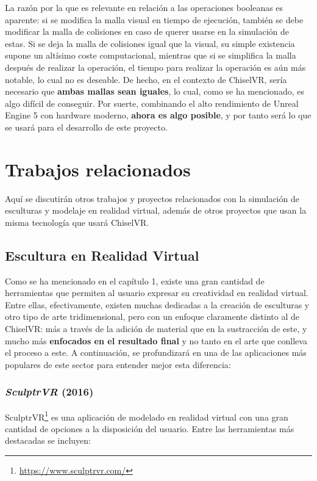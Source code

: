 La razón por la que es relevante en relación a las operaciones booleanas es aparente: si se modifica la malla visual en tiempo de ejecución, también se debe modificar la malla de colisiones en caso de querer usarse en la simulación de estas. Si se deja la malla de colisiones igual que la visual, su simple existencia supone un altísimo coste computacional, mientras que si se simplifica la malla después de realizar la operación, el tiempo para realizar la operación es aún más notable, lo cual no es deseable. De hecho, en el contexto de ChiselVR, sería necesario que \textbf{ambas mallas sean iguales}, lo cual, como se ha mencionado, es algo difícil de conseguir. Por suerte, combinando el alto rendimiento de Unreal Engine 5 con hardware moderno, \textbf{ahora es algo posible}, y por tanto será lo que se usará para el desarrollo de este proyecto.

\section{Trabajos relacionados}

Aquí se discutirán otros trabajos y proyectos relacionados con la simulación de esculturas y modelaje en realidad virtual, además de otros proyectos que usan la misma tecnología que usará ChiselVR.

\subsection{Escultura en Realidad Virtual}

Como se ha mencionado en el capítulo 1, existe una gran cantidad de herramientas que permiten al usuario expresar su creatividad en realidad virtual. Entre ellas, efectivamente, existen muchas dedicadas a la creación de esculturas y otro tipo de arte tridimensional, pero con un enfoque claramente distinto al de ChiselVR: más a través de la adición de material que en la sustracción de este, y mucho más \textbf{enfocados en el resultado final} y no tanto en el arte que conlleva el proceso a este. A continuación, se profundizará en una de las aplicaciones más populares de este sector para entender mejor esta diferencia:

\subsubsection*{\textit{SculptrVR} (2016)}

SculptrVR\footnote{\url{https://www.sculptrvr.com/}} es una aplicación de modelado en realidad virtual con una gran cantidad de opciones a la disposición del usuario. Entre las herramientas más destacadas se incluyen:

